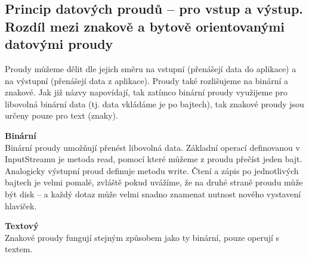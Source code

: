 \subsection[Datové proudy]{Princip datových proudů – pro vstup a výstup. Rozdíl mezi znakově a bytově orientovanými datovými proudy}
Proudy můžeme dělit dle jejich směru na vstupní (přenášejí data do aplikace) a na výstupní (přenášejí data z aplikace). Proudy také rozlišujeme na binární a znakové. Jak již názvy napovídají, tak zatímco binární proudy využijeme pro libovolná binární data (tj. data vkládáme je po bajtech), tak znakové proudy jsou určeny pouze pro text (znaky).

\textbf{Binární}\\
Binární proudy umožňují přenést libovolná data. Základní operací definovanou v InputStreamu je metoda read, pomocí které můžeme z proudu přečíst jeden bajt. Analogicky výstupní proud definuje metodu write. Čtení a zápis po jednotlivých bajtech je velmi pomalé, zvláště pokud uvážíme, že na druhé straně proudu může být disk – a každý dotaz může velmi snadno znamenat nutnost nového vystavení hlaviček.

\textbf{Textový}\\
Znakové proudy fungují stejným způsobem jako ty binární, pouze operují s textem.

\newpage
